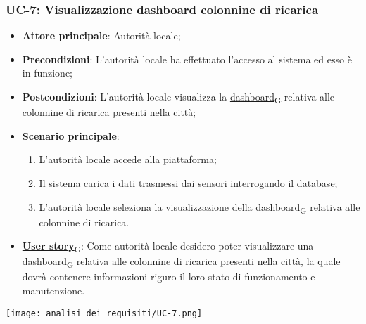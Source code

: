 \subsubsection{UC-7: Visualizzazione dashboard colonnine di ricarica}
\begin{itemize}
	\item \textbf{Attore principale}: Autorità locale;
	\item \textbf{Precondizioni}: L'autorità locale ha effettuato l'accesso al sistema ed esso è in funzione;
	\item \textbf{Postcondizioni}: L'autorità locale visualizza la \href{https://7last.github.io/docs/rtb/documentazione-interna/glossario\#dashboard}{dashboard\textsubscript{G}} relativa
	      alle colonnine di ricarica presenti nella città;
	\item \textbf{Scenario principale}:
	      \begin{enumerate}
		      \item L'autorità locale accede alla piattaforma;
		      \item Il sistema carica i dati trasmessi dai sensori interrogando il database;
		      \item L'autorità locale seleziona la visualizzazione della \href{https://7last.github.io/docs/rtb/documentazione-interna/glossario\#dashboard}{dashboard\textsubscript{G}} relativa alle colonnine di ricarica.
	      \end{enumerate}
	\item \href{https://7last.github.io/docs/rtb/documentazione-interna/glossario\#user-story}{\textbf{User story}\textsubscript{G}}:
	      Come autorità locale desidero poter visualizzare una \href{https://7last.github.io/docs/rtb/documentazione-interna/glossario\#dashboard}{dashboard\textsubscript{G}} relativa alle colonnine di ricarica presenti nella città, la quale
	      dovrà contenere informazioni riguro il loro stato di funzionamento e manutenzione.
\end{itemize}
\begin{center}
	\texttt{[image: analisi\_dei\_requisiti/UC-7.png]}
\end{center}

